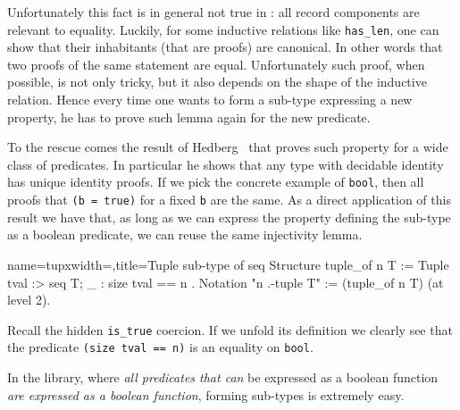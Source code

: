Unfortunately this fact is in general not true in \mcbCIC{}: all
record components are relevant to equality.
Luckily, for some inductive relations like \lstinline/has_len/, one
can show that their inhabitants (that are proofs) are canonical.  In
other words that two proofs of the same statement are equal.
Unfortunately such proof, when possible, is not only tricky, but
it also depends on the shape of the inductive relation.  Hence every
time one wants to form a sub-type expressing a new property, he has to
prove such lemma again for the new predicate.

To the rescue comes the result of Hedberg~\cite{Hedberg}
that proves such property for a wide class of predicates.
In particular he shows that any type with decidable identity
has unique identity proofs.  If we pick the concrete example
of \lstinline/bool/, then all proofs that \lstinline/(b = true)/
for a fixed \lstinline/b/ are the same.
As a direct application of this result we have that, as long as we can
express the property defining the sub-type as a boolean predicate,
we can reuse the same injectivity lemma.

\begin{coq}{name=tupx}{width=\textwidth,title=Tuple sub-type of seq}
Structure tuple_of n T :=  Tuple { tval :> seq T; _ : size tval == n }.
Notation "n .-tuple T" := (tuple_of n T) (at level 2).
\end{coq}

Recall the hidden \lstinline/is_true/ coercion.  If we unfold
its definition we clearly see that the predicate
\lstinline/(size tval == n)/ is an equality on \lstinline/bool/.

In the \mcbMC{} library, where \emph{all predicates that can} be
expressed as a boolean function \emph{are expressed as a boolean
function}, forming sub-types is extremely easy.

%



